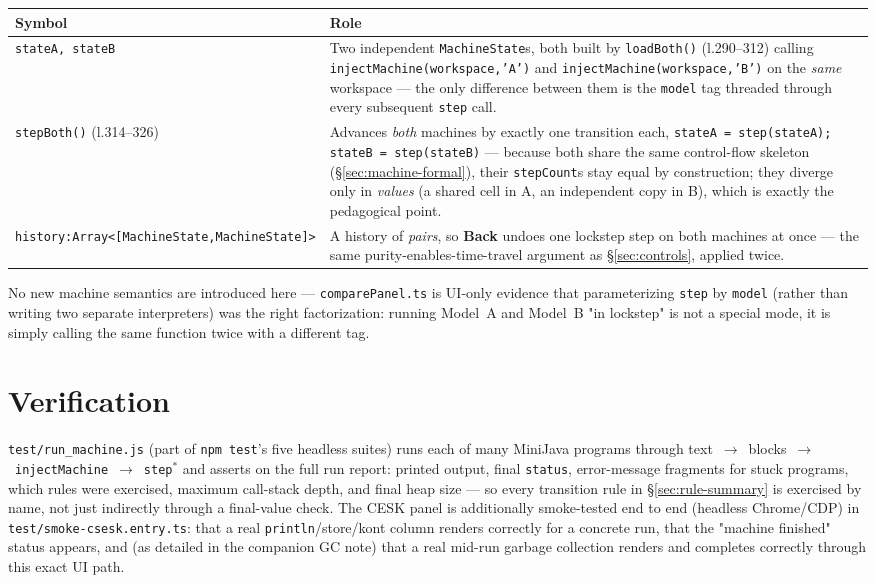 \documentclass[11pt]{article}
\begin{document}
\begin{center}
\begin{longtable}{@{}p{3.2cm}p{12.0cm}@{}}
\toprule
\textbf{Symbol} & \textbf{Role} \\
\midrule
\endhead
\texttt{stateA, stateB} &
  Two independent \texttt{MachineState}s, both built by
  \texttt{loadBoth()} (l.290--312) calling
  \texttt{injectMachine(workspace,'A')} and
  \texttt{injectMachine(workspace,'B')} on the \emph{same} workspace ---
  the only difference between them is the \texttt{model} tag threaded
  through every subsequent \texttt{step} call. \\
\texttt{stepBoth()} (l.314--326) &
  Advances \emph{both} machines by exactly one transition each,
  \texttt{stateA = step(stateA); stateB = step(stateB)} --- because both
  share the same control-flow skeleton (\S\ref{sec:machine-formal}), their
  \texttt{stepCount}s stay equal by construction; they diverge only in
  \emph{values} (a shared cell in A, an independent copy in B), which is
  exactly the pedagogical point. \\
\texttt{history:}\linebreak\texttt{Array<[}\linebreak\texttt{MachineState,}\linebreak\texttt{MachineState]>} &
  A history of \emph{pairs}, so \textbf{Back} undoes one lockstep step on
  both machines at once --- the same purity-enables-time-travel argument
  as \S\ref{sec:controls}, applied twice. \\
\bottomrule
\end{longtable}
\end{center}

No new machine semantics are introduced here --- \texttt{comparePanel.ts}
is UI-only evidence that parameterizing \texttt{step} by \texttt{model}
(rather than writing two separate interpreters) was the right
factorization: running Model~A and Model~B "in lockstep" is not a special
mode, it is simply calling the same function twice with a different tag.

\section{Verification}

\texttt{test/run\_machine.js} (part of \texttt{npm test}'s five headless
suites) runs each of many MiniJava programs through
text~$\to$~blocks~$\to$~\texttt{injectMachine}~$\to$~\texttt{step}$^{*}$
and asserts on the full run report: printed output, final
\texttt{status}, error-message fragments for stuck programs, which rules
were exercised, maximum call-stack depth, and final heap size --- so every
transition rule in \S\ref{sec:rule-summary} is exercised by name, not just
indirectly through a final-value check. The CESK panel is additionally
smoke-tested end to end (headless Chrome/CDP) in
\texttt{test/smoke-csesk.entry.ts}: that a real \texttt{println}/store/kont
column renders correctly for a concrete run, that the "machine finished"
status appears, and (as detailed in the companion GC note) that a real
mid-run garbage collection renders and completes correctly through this
exact UI path.
\end{document}
